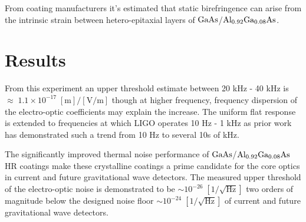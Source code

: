 From coating manufacturers it's estimated that static birefringence can arise from the intrinsic strain between hetero-epitaxial layers of $\mathrm{GaAs}$/$\mathrm{Al_{0.92}Ga_{0.08}As}$. \cite{cole:2013, adachi:1985}

\section{Results}


From this experiment an upper threshold estimate between 20 kHz - 40 kHz is $\approx \; 1.1 \times 10^{-17} \; [\mathrm{m}]/[\mathrm{V}/\mathrm{m}]$ though at higher frequency, frequency dispersion of the electro-optic coefficients may explain the increase.  The uniform flat response is extended to frequencies at which LIGO operates 10 Hz - 1 kHz as prior work has demonstrated such a trend from 10 Hz to several 10s of kHz.

The significantly improved thermal noise performance of $\mathrm{GaAs}$/$\mathrm{Al_{0.92}Ga_{0.08}As}$ HR coatings make these crystalline coatings a prime candidate for the core optics in current and future gravitational wave detectors. The measured upper threshold of the electro-optic noise is demonstrated to be $\sim 10^{-26} \; [1/\sqrt{\mathrm{Hz}}]$ two orders of magnitude below the designed noise floor $\sim 10^{-24}\; [1/\sqrt{\mathrm{Hz}}]$ of current and future gravitational wave detectors.

